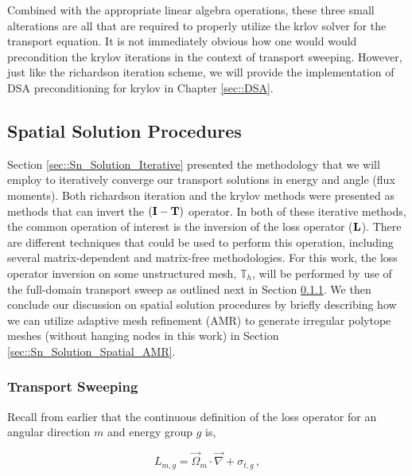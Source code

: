 Combined with the appropriate linear algebra operations, these three small alterations are all that are required to properly utilize the krlov solver for the transport equation. It is not immediately obvious how one would would precondition the krylov iterations in the context of transport sweeping. However, just like the richardson iteration scheme, we will provide the implementation of DSA preconditioning for krylov in Chapter \ref{sec::DSA}.

\subsection{Spatial Solution Procedures}
\label{sec::Sn_Solution_Spatial}

Section \ref{sec::Sn_Solution_Iterative} presented the methodology that we will employ to iteratively converge our transport solutions in energy and angle (flux moments). Both richardson iteration and the krylov methods were presented as methods that can invert the $({\bf I} - {\bf T})$ operator. In both of these iterative methods, the common operation of interest is the inversion of the loss operator (${\bf L}$). There are different techniques that could be used to perform this operation, including several matrix-dependent and matrix-free methodologies. For this work, the loss operator inversion on some unstructured mesh, $\mathbb{T}_h$, will be performed by use of the full-domain transport sweep as outlined next in Section \ref{sec::Sn_Solution_Spatial_Sweeping}. We then conclude our discussion on spatial solution procedures by briefly describing how we can utilize adaptive mesh refinement (AMR) to generate irregular polytope meshes (without hanging nodes in this work) in Section \ref{sec::Sn_Solution_Spatial_AMR}.

\subsubsection{Transport Sweeping}
\label{sec::Sn_Solution_Spatial_Sweeping}

Recall from earlier that the continuous definition of the loss operator for an angular direction $m$ and energy group $g$ is,

\begin{equation}
\label{sec::Sn_Solution_Spatial_loss_op}
L_{m,g} =  \vec{\Omega}_m \cdot   \vec{\nabla} + \sigma_{t,g} \,  ,
\end{equation}

